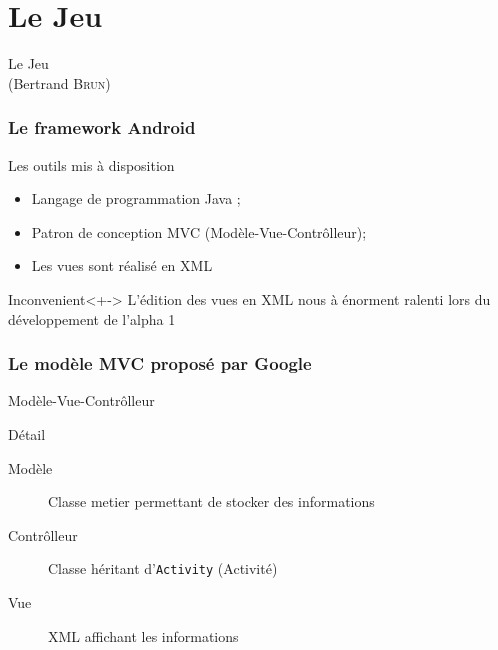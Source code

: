 \documentclass{beamer}
\def\android{Android\texttrademark}
\begin{document}
\section{Le Jeu}

\begin{frame}
  \begin{center}
    \Huge Le Jeu\\
    \Large (Bertrand \textsc{Brun})
  \end{center}
\end{frame}

\begin{frame}
\frametitle{Le framework \android{}}
\begin{block}{Les outils mis à disposition}
  \begin{itemize}
    \item<+-> Langage de programmation Java ;
    \item<+-> Patron de conception MVC (Modèle-Vue-Contrôlleur);
    \item<+-> Les vues sont réalisé en XML
  \end{itemize}
\end{block}
\begin{alertblock}{Inconvenient}<+->
  L'édition des vues en XML nous à énorment ralenti lors du développement de l'alpha 1
\end{alertblock}
\end{frame}

\begin{frame}
\frametitle{Le modèle MVC proposé par Google}
\begin{block}{Modèle-Vue-Contrôlleur}
  \centering
\end{block}
\begin{block}{Détail}
\begin{description}
  \item[Modèle] Classe metier permettant de stocker des informations
  \item[Contrôlleur] Classe héritant d'\verb!Activity! (Activité)
  \item[Vue] XML affichant les informations
\end{description}
\end{block}
\end{frame}
\end{document}
